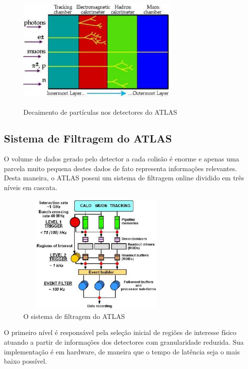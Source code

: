\documentclass[a4paper,10pt,titlepage]{article}
\begin{document}
\begin{figure}[htbp!]
 \centering
 \includegraphics[width=8cm,height=6cm]{Figs/atlas/decay_chart.pdf}
 \caption{Decaimento de partículas nos detectores do ATLAS}
 \label{fig:decay_chart}
\end{figure}

\subsection{Sistema de Filtragem do ATLAS}

O volume de dados gerado pelo detector a cada colisão é enorme e apenas uma parcela muito pequena destes dados de fato representa informações relevantes.
Desta maneira, o ATLAS possui um sistema de filtragem online dividido em três níveis em cascata.

\begin{figure}[htbp!]
 \centering
 \includegraphics[width=8cm,height=6cm]{Figs/atlas/block_diagram_trigger.pdf}
 \caption{O sistema de filtragem do ATLAS}
 \label{fig:block_diagram_trigger}
\end{figure}

O primeiro nível é responsável pela seleção inicial de regiões de interesse físico atuando a partir de informações dos detectores com granularidade reduzida.
Sua implementação é em hardware, de maneira que o tempo de latência seja o mais baixo possível.
\end{document}
